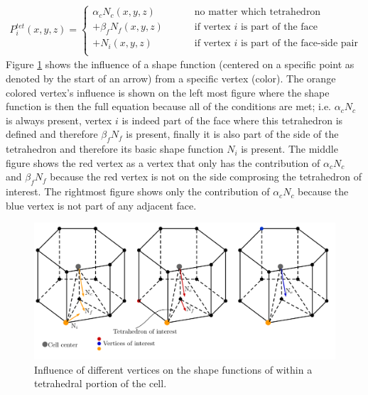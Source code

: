\documentclass[11pt,letterpaper,titlepage]{article}
\newcommand{\beqn}{\begin{equation}
	\begin{aligned}}
\newcommand{\eeqn}{\end{aligned}
	\end{equation}}
\numberwithin{equation}{section}
\begin{document}
\beqn
P_i^{tet}(x,y,z) = 
\begin{cases}
\alpha_c N_c (x,y,z)    \quad \quad &\text{ no matter which tetrahedron} \\
+\beta_f N_f(x,y,z)  \quad \quad &\text{ if vertex }i \text{ is part of the face} \\
+N_i (x,y,z) \quad \quad &\text{ if vertex }i \text{ is part of the face-side pair} \\
\end{cases}
\eeqn
\newline
Figure \ref{fig:threedtetrahedralshape} shows the influence of a shape function (centered on a specific point as denoted by the start of an arrow) from a specific vertex (color). The orange colored vertex's influence is shown on the left most figure where the shape function is then the full equation because all of the conditions are met; i.e. $\alpha_c N_c$ is always present, vertex $i$ is indeed part of the face where this tetrahedron is defined and therefore $\beta_f N_f$ is present, finally it is also part of the side of the tetrahedron and therefore its basic shape function $N_i$ is present.
\newline
\newline
The middle figure shows the red vertex as a vertex that only has the contribution of $\alpha_c N_c$ and $\beta_f N_f$ because the red vertex is not on the side comprosing the tetrahedron of interest. The rightmost figure shows only the contribution of $\alpha_c N_c$ because the blue vertex is not part of any adjacent face. 

\begin{figure}[H]
\centering
\includegraphics[width=1\linewidth]{LatexDraw/ThreeDTetrahedralShape}
\caption{Influence of different vertices on the shape functions of within a tetrahedral portion of the cell.}
\label{fig:threedtetrahedralshape}
\end{figure}
\end{document}
